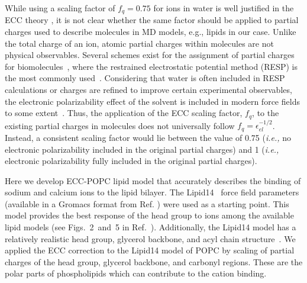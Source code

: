 \documentclass[aip,jcp,twocolumn]{revtex4}
\begin{document}
While using a scaling factor of $f_q = 0.75$ for ions in water is well justified in the ECC theory \cite{leontyev11}, it is not clear whether the same factor should be applied to partial charges used to describe molecules in MD models, e.g., lipids in our case. Unlike the total charge of an ion, atomic partial charges within molecules are not physical observables. Several schemes exist for the assignment of partial charges for biomolecules~\cite{Hu2007}, where the restrained electrostatic potential method (RESP) is the most commonly used~\cite{RESP_paper, Singh1984}. Considering that water is often included in RESP calculations or charges are refined to improve certain experimental observables, the electronic polarizability effect of the solvent is included in modern force fields to some extent~\cite{RESP_paper, Singh1984, jorgensen96, ipolq2013, benavides17}. Thus, the application of the ECC scaling factor, $f_q$, to the existing partial charges in molecules does not universally follow $f_q = \epsilon _{el} ^{-1/2}$. Instead, a consistent scaling factor would lie between the value of 0.75  (\textit{i.e.,} no electronic polarizability included in the original partial charges) and 1 (\textit{i.e.,} electronic polarizability fully included in the original partial charges). 

Here we develop ECC-POPC lipid model that accurately describes the binding 
of sodium and calcium ions to the lipid bilayer. 
The Lipid14~\cite{dickson14} force field parameters 
(available in a Gromacs format from Ref. ) were used as a starting 
point. 
This model provides the best response of the head group to ions among the available 
lipid models (see Figs.~2~and~5 in Ref.~). Additionally, the Lipid14 model 
has a relatively realistic head group, glycerol backbone, and acyl chain structure~\cite{dickson14,botan15}.
We applied the ECC correction 
to the Lipid14 model of POPC by scaling of 
partial charges of the head group, glycerol 
backbone, and carbonyl regions. 
These are the polar parts of phospholipids which can 
contribute to the cation binding. 
\end{document}
